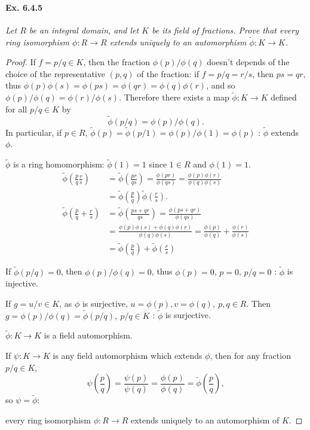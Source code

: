 \documentclass[11pt,a4paper]{article}
\begin{document}
\paragraph{Ex. 6.4.5}

{\it Let $R$ be an integral domain, and let $K$ be its field of fractions. Prove that every ring isomorphism $\phi : R \to R$ extends uniquely to an automorphism $\tilde{\phi} : K \to K$.
}

\begin{proof}

If $f = p/q \in K$, then the fraction $\phi(p)/\phi(q)$ doesn't depends of the choice of the representative $(p,q)$ of the fraction: if $f = p/q = r/s$, then $ps=qr$, thus $\phi(p)\phi(s) = \phi(ps) = \phi(qr) =\phi(q)\phi(r)$, and so $\phi(p)/\phi(q) = \phi(r)/\phi(s)$. Therefore there exists a map $\tilde{\phi} : K \to K$ defined for all $p/q\in  K$ by
$$\tilde{\phi}(p/q) = \phi(p)/\phi(q).$$
In particular, if $p\in R$, $\tilde{\phi}(p) = \tilde{\phi}(p/1) = \phi(p)/\phi(1) = \phi(p)$ : $\tilde{\phi}$ extends $\phi$.

$\tilde{\phi}$ is a ring homomorphism: $\tilde{\phi}(1) = 1$ since $1 \in R$ and $\phi(1)=1$.
\begin{align*}
\tilde{\phi}\left(\frac{p}{q} \frac{r}{s}\right) &= \tilde{\phi}\left(\frac{pr}{qs}\right) =\frac{ \phi(pr)}{\phi(qs)}
 =\frac{\phi(p) \phi(r)}{\phi(q)\phi(s)}\\
 & =\tilde{\phi}\left(\frac{p}{q}\right) \tilde{\phi}\left(\frac{r}{s}\right).\\
\tilde{\phi}\left(\frac{p}{q} +\frac{r}{s}\right) &=  \tilde{\phi}\left(\frac{ps+qr}{qs}\right)= \frac{ \phi(ps+qr)}{\phi(qs)}\\
&=\frac{\phi(p)\phi(s)+\phi(q) \phi(r)}{\phi(q)\phi(s)} = \frac{\phi(p)}{\phi(q)}+ \frac{\phi(r)}{\phi(s)} \\
&= \tilde{\phi}\left(\frac{p}{q}\right) + \tilde{\phi}\left(\frac{r}{s}\right) 
\end{align*}

If $\tilde{\phi}(p/q) =0$, then $\phi(p)/\phi(q) =0$, thus $\phi(p) = 0$, $p=0$, $p/q = 0$ : $\tilde{\phi}$ is injective.

If $g = u/v \in K$, as $\phi$ is surjective, $u = \phi(p),v=\phi(q),\  p,q\in R$. Then $g = \phi(p)/\phi(q) = \tilde{\phi}(p/q),\  p/q \in K$ : $\tilde{\phi}$ is surjective.

$\tilde{\phi} : K \to K$ is a field automorphism.

If $\psi : K \to K$ is any field automorphism which extends $\phi$, then for any fraction $p/q \in K$,
$$\psi \left(\frac{p}{q} \right) = \frac{\psi(p)}{\psi(q)} = \frac{\phi(p)}{\phi(q)} = \tilde{\phi}\left(\frac{p}{q}\right),$$
so $\psi = \tilde{\phi}$:

every ring isomorphism $\phi : R \to R$ extends uniquely to an automorphism of $K$.
\end{proof}
\end{document}
